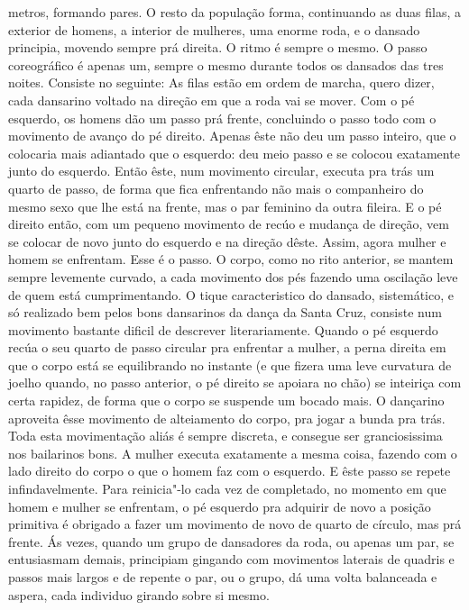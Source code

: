 metros, formando pares. O resto da população forma, continuando as duas
filas, a exterior de homens, a interior de mulheres, uma enorme roda, e
o dansado principia, movendo sempre prá direita. O ritmo é sempre o
mesmo. O passo coreográfico é apenas um, sempre o mesmo durante todos os
dansados das tres noites. Consiste no seguinte: As filas estão em ordem
de marcha, quero dizer, cada dansarino voltado na direção em que a roda
vai se mover. Com o pé esquerdo, os homens dão um passo prá frente,
concluindo o passo todo com o movimento de avanço do pé direito. Apenas
êste não deu um passo inteiro, que o colocaria mais adiantado que o
esquerdo: deu meio passo e se colocou exatamente junto do esquerdo.
Então êste, num movimento circular, executa pra trás um quarto de passo,
de forma que fica enfrentando não mais o companheiro do mesmo sexo que
lhe está na frente, mas o par feminino da outra fileira. E o pé direito
então, com um pequeno movimento de recúo e mudança de direção, vem se
colocar de novo junto do esquerdo e na direção dêste. Assim, agora
mulher e homem se enfrentam. Esse é o passo. O corpo, como no rito
anterior, se mantem sempre levemente curvado, a cada movimento dos pés
fazendo uma oscilação leve de quem está cumprimentando. O tique
caracteristico do dansado, sistemático, e só realizado bem pelos bons
dansarinos da dança da Santa Cruz, consiste num movimento bastante
dificil de descrever literariamente. Quando o pé esquerdo recúa o seu
quarto de passo circular pra enfrentar a mulher, a perna direita em que
o corpo está se equilibrando no instante (e que fizera uma leve
curvatura de joelho quando, no passo anterior, o pé direito se apoiara
no chão) se inteiriça com certa rapidez, de forma que o corpo se
suspende um bocado mais. O dançarino aproveita êsse movimento de
alteiamento do corpo, pra jogar a bunda pra trás. Toda esta movimentação
aliás é sempre discreta, e consegue ser granciosissima nos bailarinos
bons. A mulher executa exatamente a mesma coisa, fazendo com o lado
direito do corpo o que o homem faz com o esquerdo. E êste passo se
repete infindavelmente. Para reinicia"-lo cada vez de completado, no
momento em que homem e mulher se enfrentam, o pé esquerdo pra adquirir
de novo a posição primitiva é obrigado a fazer um movimento de novo de
quarto de círculo, mas prá frente. Ás vezes, quando um grupo de
dansadores da roda, ou apenas um par, se entusiasmam demais, principiam
gingando com movimentos laterais de quadris e passos mais largos e de
repente o par, ou o grupo, dá uma volta balanceada e aspera, cada
individuo girando sobre si mesmo.

